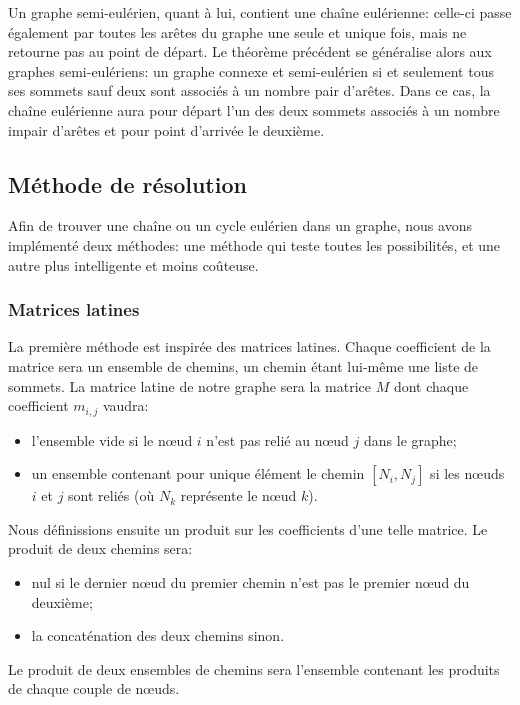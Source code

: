 \documentclass{scrartcl}
\begin{document}
    Un graphe semi-eulérien, quant à lui, contient une chaîne eulérienne:
    celle-ci passe également par toutes les arêtes du graphe une seule et
    unique fois, mais ne retourne pas au point de départ. Le théorème précédent
    se généralise alors aux graphes semi-eulériens: un graphe connexe et
    semi-eulérien si et seulement tous ses sommets sauf deux sont associés à un
    nombre pair d'arêtes. Dans ce cas, la chaîne eulérienne aura pour départ
    l'un des deux sommets associés à un nombre impair d'arêtes et pour point
    d'arrivée le deuxième.

  \subsection{Méthode de résolution}
    Afin de trouver une chaîne ou un cycle eulérien dans un graphe, nous avons
    implémenté deux méthodes: une méthode qui teste toutes les possibilités,
    et une autre plus intelligente et moins coûteuse.

    \subsubsection{Matrices latines}
      La première méthode est inspirée des matrices latines. Chaque coefficient
      de la matrice sera un ensemble de chemins, un chemin étant lui-même une
      liste de sommets. La matrice latine de notre graphe sera la matrice $M$
      dont chaque coefficient $m_{i,j}$ vaudra:
      \begin{itemize}
        \item l'ensemble vide si le nœud $i$ n'est pas relié au nœud $j$ dans
          le graphe;
        \item un ensemble contenant pour unique élément le chemin $[N_i,N_j]$
          si les nœuds $i$ et $j$ sont reliés (où $N_k$ représente le nœud
          $k$).
      \end{itemize}

      Nous définissions ensuite un produit sur les coefficients d'une telle
      matrice. Le produit de deux chemins sera:
      \begin{itemize}
        \item nul si le dernier nœud du premier chemin n'est pas le premier
          nœud du deuxième;
        \item la concaténation des deux chemins sinon.
      \end{itemize}

      Le produit de deux ensembles de chemins sera l'ensemble contenant les
      produits de chaque couple de nœuds.
\end{document}
